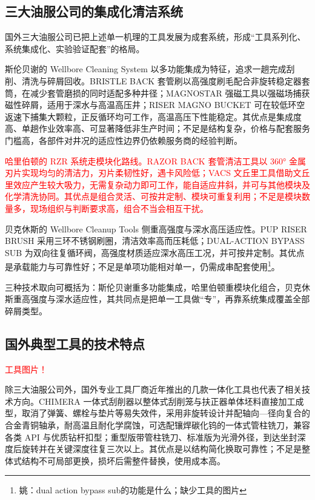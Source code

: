 \subsection{三大油服公司的集成化清洁系统}

国外三大油服公司已把上述单一机理的工具发展为成套系统，形成“工具系列化、系统集成化、实验验证配套”的格局。

斯伦贝谢的 Wellbore Cleaning System 以多功能集成为特征，追求一趟完成刮削、清洗与碎屑回收。BRISTLE BACK 套管刷以高强度刷毛配合非旋转稳定器套筒，在减少套管磨损的同时适配多种井径；MAGNOSTAR 强磁工具以强磁场捕获磁性碎屑，适用于深水与高温高压井；RISER MAGNO BUCKET 可在较低环空返速下捕集大颗粒，正反循环均可工作，高温高压下性能稳定。其优点是集成度高、单趟作业效率高、可显著降低非生产时间；不足是结构复杂，价格与配套服务门槛高，各部件对井况的适应性边界仍依赖服务商的经验判断。

\textcolor{red}{哈里伯顿的 RZR 系统走模块化路线。RAZOR BACK 套管清洁工具以 360° 金属刃片实现均匀的清洁力，刃片柔韧性好，遇卡风险低；VACS 文丘里工具借助文丘里效应产生较大吸力，无需复杂动力即可工作，能自适应井斜，并可与其他模块及化学清洗协同。其优点是组合灵活、可按井定制、模块可重复利用；不足是模块数量多，现场组织与判断要求高，组合不当会相互干扰。}

贝克休斯的 Wellbore Cleanup Tools 侧重高强度与深水高压适应性。PUP RISER BRUSH 采用三环不锈钢刷圈，清洁效率高而压耗低；DUAL-ACTION BYPASS SUB 为双向往复循环阀，高强度材质适应深水高压工况，并可按井定制。其优点是承载能力与可靠性好；不足是单项功能相对单一，仍需成串配套使用\footnote{姚：dual action bypass sub的功能是什么；缺少工具的图片}。

三种技术取向可概括为：斯伦贝谢重多功能集成，哈里伯顿重模块化组合，贝克休斯重高强度与深水适应性，其共同点是把单一工具做“专”，再靠系统集成覆盖全部碎屑类型。

\subsection{国外典型工具的技术特点}

\textcolor{red}{工具图片！}

除三大油服公司外，国外专业工具厂商近年推出的几款一体化工具也代表了相关技术方向。CHIMERA 一体式刮削器以整体式刮削笼与扶正器单体坯料直接加工成型，取消了弹簧、螺栓与垫片等易失效件，采用非旋转设计并配轴向—径向复合的合金青铜轴承，耐高温且耐化学腐蚀，可选配镶焊碳化钨的一体式管柱铣刀，兼容各类 API 与优质钻杆扣型；重型版带管柱铣刀、标准版为光滑外径，到达坐封深度后旋转并在关键深度往复三次以上。其优点是以结构简化换取可靠性；不足是整体式结构不可局部更换，损坏后需整件替换，使用成本高。

